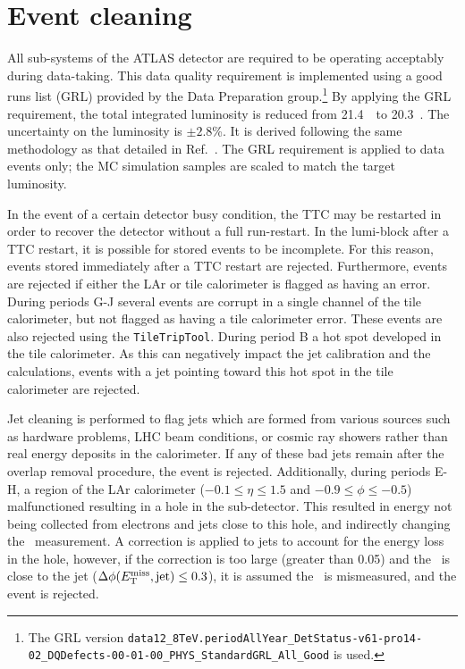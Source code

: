 \FloatBarrier
\section{Event cleaning}
\label{sec:event_cleaning}

All sub-systems of the ATLAS detector are required to be operating acceptably
during data-taking. 
This data quality requirement is implemented using a good runs list (GRL)
provided by the Data Preparation group.\footnote{The GRL version
\texttt{data12\_8TeV.periodAllYear\_DetStatus-v61-pro14-02\_DQDefects-00-01-00\_PHYS\_StandardGRL\_All\_Good}
is used.}
By applying the GRL requirement, the total integrated luminosity is reduced
from 21.4~\ifb\ to 20.3~\ifb.
The uncertainty on the luminosity is $\pm 2.8$\%.
It is derived following the same methodology as that detailed
in Ref.~\cite{Lumi}.
The GRL requirement is applied to data events only; the MC simulation samples
are scaled to match the target luminosity.

In the event of a certain detector busy condition, the TTC may be restarted in
order to recover the detector without a full run-restart. In the lumi-block
after a TTC restart, it is possible for stored events to be incomplete.
For this reason, events stored immediately after a TTC restart are rejected.
Furthermore, events are rejected if either the LAr or tile calorimeter is
flagged as having an error.
During periods G-J several events are corrupt in a single channel of the tile
calorimeter, but not flagged as having a tile calorimeter error.
These events are also rejected using the \texttt{TileTripTool}.
During period B a hot spot developed in the tile calorimeter.
As this can negatively impact the jet calibration and the \met calculations,
events with a jet pointing toward this hot spot in the tile calorimeter are
rejected.

Jet cleaning is performed to flag jets which are formed from various sources
such as hardware problems, LHC beam conditions, or cosmic ray showers rather
than real energy deposits in the calorimeter.
If any of these bad jets remain after the overlap removal procedure, the event
is rejected.
Additionally, during periods E-H, a region of the LAr
calorimeter ($-0.1\le\eta\le1.5$ and $-0.9\le\phi\le-0.5$) malfunctioned
resulting in a hole in the sub-detector.
This resulted in energy not being collected from electrons and jets close to
this hole, and indirectly changing the \met\ measurement.
A correction is applied to jets to account for the energy loss in the hole,
however, if the correction is too large (greater than 0.05) and the \met\ is
close to the jet ($\Delta\phi(E_{\mathrm{T}}^{\mathrm{miss}}, \text{jet}) \le 0.3$), it is assumed the
\met\ is mismeasured, and the event is rejected.

